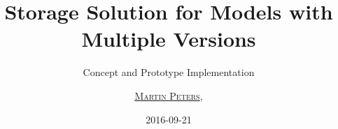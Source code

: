 \usepackage[utf8]{inputenc}
\usepackage{pifont}
\usepackage{arev}

\author[
	\textbf{\href{http://www.sbi.uni-rostock.de/team/single/martin-peters/}{Martin Peters}}
]
{
	\underline{\textsc{\href{http://freakybytes.net}{Martin Peters}}},
}

\date{2016-09-21}



\titlegraphic{
}
\title[Storage Solution for Models with Multiple Versions]{\Large Storage Solution for Models with Multiple Versions}
\subtitle{\small Concept and Prototype Implementation}


\titleimage{}
\renewcommand{\mylogo}{
}

